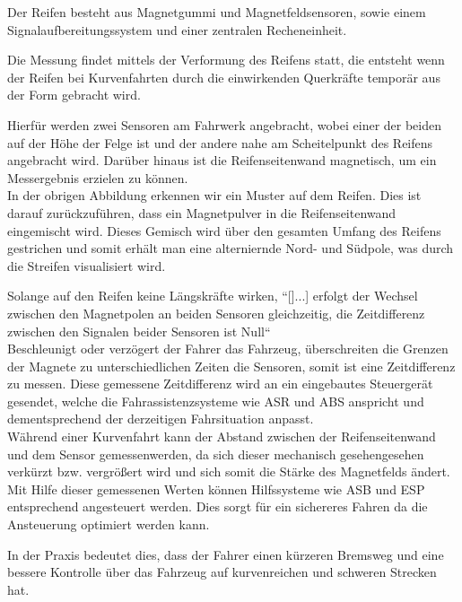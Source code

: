                 Der Reifen besteht aus Magnetgummi und Magnetfeldsensoren, sowie einem Signalaufbereitungssystem und einer zentralen Recheneinheit.
					
                Die Messung findet mittels der Verformung des Reifens statt, die entsteht wenn der Reifen bei Kurvenfahrten durch die einwirkenden Querkräfte temporär aus der Form gebracht wird. 
                
                Hierfür werden zwei Sensoren am Fahrwerk angebracht, wobei einer der beiden auf der Höhe der Felge ist und der andere nahe am Scheitelpunkt des Reifens angebracht wird. Darüber hinaus ist die Reifenseitenwand magnetisch, um ein Messergebnis erzielen zu können.\\
                In der obrigen Abbildung erkennen wir ein Muster auf dem Reifen. Dies ist darauf zurückzuführen, dass ein Magnetpulver in die Reifenseitenwand eingemischt wird. Dieses Gemisch wird über den gesamten Umfang des Reifens gestrichen und somit erhält man eine alterniernde Nord- und Südpole, was durch die Streifen visualisiert wird.
                
                Solange auf den Reifen keine Längskräfte wirken, ``[]...] erfolgt der Wechsel zwischen den Magnetpolen an beiden Sensoren gleichzeitig, die Zeitdifferenz zwischen den Signalen beider Sensoren ist Null`` \cite{TS_swt} \\	
                Beschleunigt oder verzögert der Fahrer das Fahrzeug, überschreiten die Grenzen der Magnete zu unterschiedlichen Zeiten die Sensoren, somit ist eine Zeitdifferenz zu messen. 
                Diese gemessene Zeitdifferenz wird an ein eingebautes Steuergerät gesendet, welche die Fahrassistenzsysteme wie ASR und ABS anspricht und dementsprechend der derzeitigen Fahrsituation anpasst.\\
                
				Während einer Kurvenfahrt kann der Abstand zwischen der Reifenseitenwand und dem Sensor gemessenwerden, da sich dieser mechanisch gesehengesehen verkürzt bzw. vergrößert wird und sich somit die Stärke des Magnetfelds ändert.\\
                Mit Hilfe dieser gemessenen Werten können Hilfssysteme wie ASB und ESP entsprechend angesteuert werden. Dies sorgt für ein sichereres Fahren da die Ansteuerung optimiert werden kann. 
                
                In der Praxis bedeutet dies, dass der Fahrer einen kürzeren Bremsweg und eine bessere Kontrolle über das Fahrzeug auf kurvenreichen und schweren Strecken hat.

